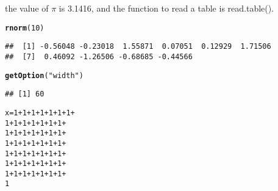 \documentclass{article}\usepackage[]{graphicx}\usepackage[]{color}
\makeatletter
\newcommand{\hlnum}[1]{\textcolor[rgb]{0.686,0.059,0.569}{#1}}%
\newcommand{\hlstr}[1]{\textcolor[rgb]{0.192,0.494,0.8}{#1}}%
\newcommand{\hlopt}[1]{\textcolor[rgb]{0,0,0}{#1}}%
\newcommand{\hlstd}[1]{\textcolor[rgb]{0.345,0.345,0.345}{#1}}%
\newcommand{\hlkwb}[1]{\textcolor[rgb]{0.69,0.353,0.396}{#1}}%
\newcommand{\hlkwd}[1]{\textcolor[rgb]{0.737,0.353,0.396}{\textbf{#1}}}%
\newenvironment{kframe}{%
 \def\at@end@of@kframe{}%
 \ifinner\ifhmode%
  \def\at@end@of@kframe{\end{minipage}}%
  \begin{minipage}{\columnwidth}%
 \fi\fi%
 \def\FrameCommand##1{\hskip\@totalleftmargin \hskip-\fboxsep
 \colorbox{shadecolor}{##1}\hskip-\fboxsep
     \hskip-\linewidth \hskip-\@totalleftmargin \hskip\columnwidth}%
 \MakeFramed {\advance\hsize-\width
   \@totalleftmargin\z@ \linewidth\hsize
   \@setminipage}}%
 {\par\unskip\endMakeFramed%
 \at@end@of@kframe}
\newenvironment{knitrout}{}{} %
\makeatother
\begin{document}
the value of $\pi$ is 3.1416, and the function to read a table is read.table().

\begin{knitrout}
\color{fgcolor}\begin{kframe}
\begin{alltt}
\hlkwd{rnorm}\hlstd{(}\hlnum{10}\hlstd{)}
\end{alltt}
\begin{verbatim}
##  [1] -0.56048 -0.23018  1.55871  0.07051  0.12929  1.71506
##  [7]  0.46092 -1.26506 -0.68685 -0.44566
\end{verbatim}
\end{kframe}
\end{knitrout}
\begin{knitrout}
\color{fgcolor}\begin{kframe}
\begin{alltt}
\hlkwd{getOption}\hlstd{(}\hlstr{"width"}\hlstd{)}
\end{alltt}
\begin{verbatim}
## [1] 60
\end{verbatim}
\begin{alltt}
\hlstd{x} \hlkwb{=} \hlnum{1} \hlopt{+} \hlnum{1} \hlopt{+} \hlnum{1} \hlopt{+} \hlnum{1} \hlopt{+} \hlnum{1} \hlopt{+} \hlnum{1} \hlopt{+} \hlnum{1} \hlopt{+}
    \hlnum{1} \hlopt{+} \hlnum{1} \hlopt{+} \hlnum{1} \hlopt{+} \hlnum{1} \hlopt{+} \hlnum{1} \hlopt{+} \hlnum{1} \hlopt{+} \hlnum{1} \hlopt{+}
    \hlnum{1} \hlopt{+} \hlnum{1} \hlopt{+} \hlnum{1} \hlopt{+} \hlnum{1} \hlopt{+} \hlnum{1} \hlopt{+} \hlnum{1} \hlopt{+} \hlnum{1} \hlopt{+}
    \hlnum{1} \hlopt{+} \hlnum{1} \hlopt{+} \hlnum{1} \hlopt{+} \hlnum{1} \hlopt{+} \hlnum{1} \hlopt{+} \hlnum{1} \hlopt{+} \hlnum{1} \hlopt{+}
    \hlnum{1} \hlopt{+} \hlnum{1} \hlopt{+} \hlnum{1} \hlopt{+} \hlnum{1} \hlopt{+} \hlnum{1} \hlopt{+} \hlnum{1} \hlopt{+} \hlnum{1} \hlopt{+}
    \hlnum{1} \hlopt{+} \hlnum{1} \hlopt{+} \hlnum{1} \hlopt{+} \hlnum{1} \hlopt{+} \hlnum{1} \hlopt{+} \hlnum{1} \hlopt{+} \hlnum{1} \hlopt{+}
    \hlnum{1} \hlopt{+} \hlnum{1} \hlopt{+} \hlnum{1} \hlopt{+} \hlnum{1} \hlopt{+} \hlnum{1} \hlopt{+} \hlnum{1} \hlopt{+} \hlnum{1} \hlopt{+}
    \hlnum{1}
\end{alltt}
\end{kframe}
\end{knitrout}
\end{document}
